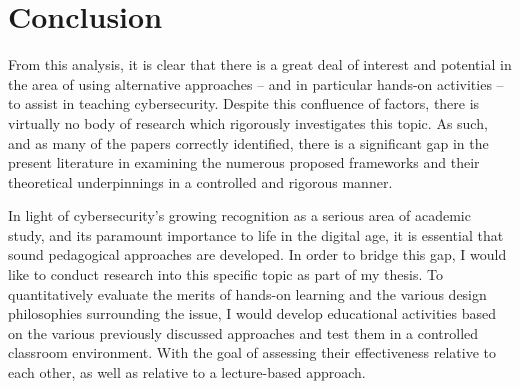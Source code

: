 \documentclass{article}
\begin{document}
\section{Conclusion}

    From this analysis, it is clear that there is a great deal of interest and potential in the area of using alternative approaches -- and in particular hands-on activities -- to assist in teaching cybersecurity. 
    Despite this confluence of factors, there is virtually no body of research which rigorously investigates this topic. 
    As such, and as many of the papers correctly identified, there is a significant gap in the present literature in examining the numerous proposed frameworks and their theoretical underpinnings in a controlled and rigorous manner. 

    In light of cybersecurity’s growing recognition as a serious area of academic study, and its paramount importance to life in the digital age, it is essential that sound pedagogical approaches are developed. 
    In order to bridge this gap, I would like to conduct research into this specific topic as part of my thesis. 
    To quantitatively evaluate the merits of hands-on learning and the various design philosophies surrounding the issue, I would develop educational activities based on the various previously discussed approaches and test them in a controlled classroom environment. 
    With the goal of assessing their effectiveness relative to each other, as well as relative to a lecture-based approach. 


\printbibliography
\end{document}
